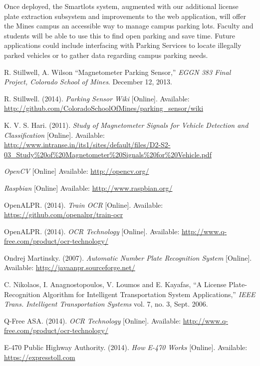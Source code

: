 \documentclass[11pt, oneside, fullpage, doublespace]{article}
\begin{document}
Once deployed, the Smartlots system, augmented with our additional license plate extraction subsystem and improvements to the web application, will offer the Mines campus an accessible way to manage campus parking lots. Faculty and students will be able to use this to find open parking and save time. Future applications could include interfacing with Parking Services to locate illegally parked vehicles or to gather data regarding campus parking needs.

\begin{thebibliography}{99}
 R. Stillwell, A. Wilson ``Magnetometer Parking Sensor,'' \emph{EGGN 383 Final Project, Colorado School of Mines}. December 12, 2013.

 R. Stillwell. (2014). \emph{Parking Sensor Wiki} [Online]. Available: \url{http://github.com/ColoradoSchoolOfMines/parking_sensor/wiki}

 K. V. S. Hari. (2011). \emph{Study of Magnetometer Signals for Vehicle Detection and Classification} [Online]. Available: \url{http://www.intranse.in/its1/sites/default/files/D2-S2-03_Study\%20of\%20Magnetometer\%20Signals\%20for\%20Vehicle.pdf}

 \emph{OpenCV} [Online] Available: \url{http://opencv.org/}

 \emph{Raspbian} [Online] Available: \url{http://www.raspbian.org/}

 OpenALPR. (2014). \emph{Train OCR} [Online]. Available: \url{https://github.com/openalpr/train-ocr}

 OpenALPR. (2014). \emph{OCR Technology} [Online]. Available: \url{http://www.q-free.com/product/ocr-technology/}

 Ondrej Martinsky. (2007). \emph{Automatic Number Plate Recognition System} [Online]. Available: \url{http://javaanpr.sourceforge.net/}

 C. Nikolaos, I. Anagnostopoulos, V. Loumos and E. Kayafas, ``A License Plate-Recognition Algorithm for Intelligent Transportation System Applications,'' \emph{IEEE Trans. Intelligent Transportation Systems} vol. 7, no. 3, Sept. 2006.

 Q-Free ASA. (2014). \emph{OCR Technology} [Online]. Available: \url{http://www.q-free.com/product/ocr-technology/}

 E-470 Public Highway Authority. (2014). \emph{How E-470 Works} [Online]. Available: \url{https://expresstoll.com}


\end{thebibliography}
\end{document}
